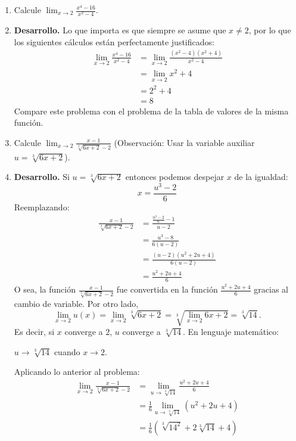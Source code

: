 \documentclass[10pt]{article}
\newcommand{\2}[1]{\hspace{-0.93cm}\colorbox{color1}{\hspace{0.07cm} \parbox{17cm}{\vspace{0.2cm} #1}\hspace*{0.07cm} }}
\newcommand{\3}[1]{\hspace{-0.93cm}\colorbox{color7}{\hspace{0.07cm} \parbox{17cm}{\vspace{0.2cm} #1}\hspace*{0.07cm} }}
\theoremstyle{theorem}
\numberwithin{equation}{section}
\newcommand{\dis}{\displaystyle}
\begin{document}
\begin{enumerate}[1.]
  \item Calcule $\dis \lim_{x\to 2}\frac{x^4-16}{x^2-4}$.
  \item[] \textbf{Desarrollo.} Lo que importa es que siempre se asume que $x\neq 2$, por lo que los siguientes c\'alculos est\'an perfectamente justificados:
  \begin{align*}
  \lim_{x\to 2}\frac{x^4-16}{x^2-4}&=\lim_{x\to 2}\frac{(x^2-4)(x^2+4)}{x^2-4}\\
                                   &=\lim_{x\to 2}x^2+4\\
                                   &=2^2+4\\
                                   &=8
\end{align*}   Compare este problema con el problema de la tabla de valores de la misma funci\'on.
  \item Calcule $\dis \lim_{x\to 2}\frac{x-1}{\sqrt[3]{6x+2}-2}$ (Observaci\'on: Usar la variable auxiliar $u=\sqrt[3]{6x+2}$).
  \item[] \textbf{Desarrollo.} Si $u=\sqrt[3]{6x+2}$ entonces podemos despejar $x$ de la igualdad: $$x=\frac{u^3-2}{6}$$
  Reemplazando:
  \begin{align*}
  \frac{x-1}{\sqrt[3]{6x+2}-2}&=\frac{\frac{u^3-2}{6}-1}{u-2}\\
                              &=\frac{u^3-8}{6(u-2)}\\
                              &=\frac{(u-2)(u^2+2u+4)}{6(u-2)}\\
                              &=\frac{u^2+2u+4}{6}
  \end{align*} O sea, la funci\'on $\dis \frac{x-1}{\sqrt[3]{6x+2}-2}$ fue convertida en la funci\'on $\dis \frac{u^2+2u+4}{6}$ gracias al cambio de variable. Por otro lado, $$ \lim_{x\to 2}u(x)= \lim_{x\to 2}\sqrt[3]{6x+2}=\sqrt[3]{\lim_{x\to 2} 6x+2}=\sqrt[3]{14}.$$ Es decir, si $x$ converge a $2$, $u$ converge a $\sqrt[3]{14}$. En lenguaje matem\'atico: 
  \begin{center}
  $u\to \sqrt[3]{14}$ cuando $x\to 2$.
  \end{center}
  Aplicando lo anterior al problema:
  \begin{align*}
  \lim_{x\to 2}\frac{x-1}{\sqrt[3]{6x+2}-2}&=\lim_{u\to \sqrt[3]{14}}\frac{u^2+2u+4}{6}\\
                                           &=\frac{1}{6}\lim_{u\to \sqrt[3]{14}}(u^2+2u+4)\\
                                           &=\frac{1}{6}\left( \sqrt[3]{14^2}+2\sqrt[3]{14}+4 \right)\\

\end{align*}
\end{enumerate}
\end{document}
